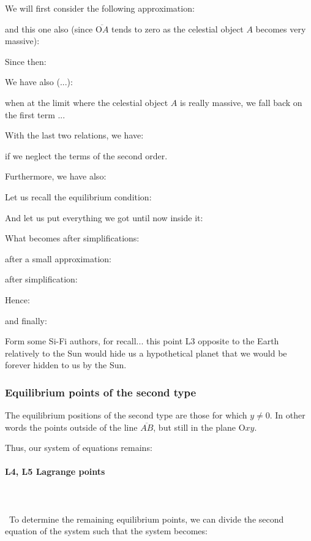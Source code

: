 	We will first consider the following approximation:
	
	and this one also (since $\overline{\text{O}A}$ tends to zero as the celestial object $A$ becomes very massive):
	
	Since then:
	
	We have also (...):
	
	when at the limit where the celestial object $A$ is really massive, we fall back on the first term ...

	With the last two relations, we have:
	
	if we neglect the terms of the second order.

	Furthermore, we have also:
	
	Let us recall the equilibrium condition:
	
	And let us put everything we got until now inside it:
	
	What becomes after simplifications:
	
	after a small approximation:
	
	after simplification:
	
	Hence:
	
	and finally:
	
	\begin{tcolorbox}[title=Remark,colframe=black,arc=10pt]
	Form some Si-Fi authors, for recall... this point L3 opposite to the Earth relatively to the Sun would hide us a hypothetical planet that we would be forever hidden to us by the Sun.
	\end{tcolorbox}
	
	\subsubsection{Equilibrium points of the second type}
	The equilibrium positions of the second type are those for which $y\neq 0$. In other words the points outside of the line $\overline{AB}$, but still in the plane $\text{O}xy$.

	Thus, our system of equations remains:
	
	
	\paragraph{L4, L5 Lagrange points}\mbox{}\\\\\
	To determine the remaining equilibrium points, we can divide the second equation of the system such that the system becomes:
	
